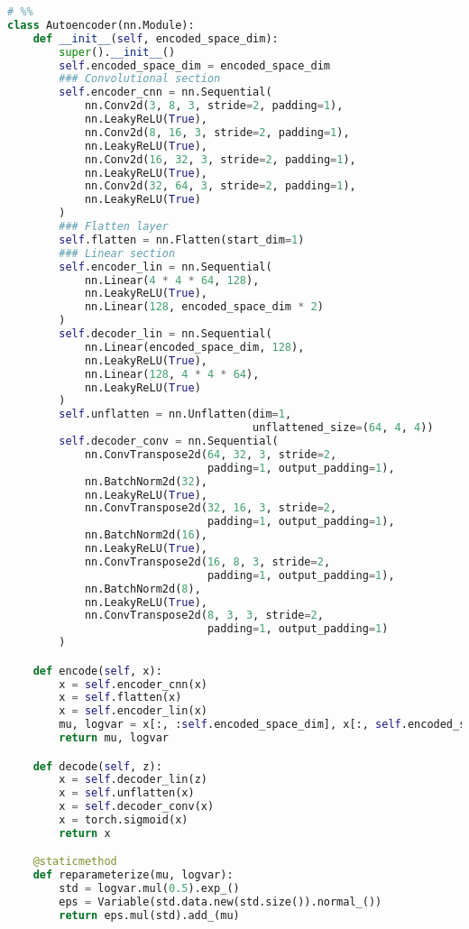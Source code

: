 \documentclass{article}
\begin{document}
\begin{lstlisting}[language=Python]
# %%
class Autoencoder(nn.Module):
    def __init__(self, encoded_space_dim):
        super().__init__()
        self.encoded_space_dim = encoded_space_dim
        ### Convolutional section
        self.encoder_cnn = nn.Sequential(
            nn.Conv2d(3, 8, 3, stride=2, padding=1),
            nn.LeakyReLU(True),
            nn.Conv2d(8, 16, 3, stride=2, padding=1),
            nn.LeakyReLU(True),
            nn.Conv2d(16, 32, 3, stride=2, padding=1),
            nn.LeakyReLU(True),
            nn.Conv2d(32, 64, 3, stride=2, padding=1),
            nn.LeakyReLU(True)
        )
        ### Flatten layer
        self.flatten = nn.Flatten(start_dim=1)
        ### Linear section
        self.encoder_lin = nn.Sequential(
            nn.Linear(4 * 4 * 64, 128),
            nn.LeakyReLU(True),
            nn.Linear(128, encoded_space_dim * 2)
        )
        self.decoder_lin = nn.Sequential(
            nn.Linear(encoded_space_dim, 128),
            nn.LeakyReLU(True),
            nn.Linear(128, 4 * 4 * 64),
            nn.LeakyReLU(True)
        )
        self.unflatten = nn.Unflatten(dim=1,
                                      unflattened_size=(64, 4, 4))
        self.decoder_conv = nn.Sequential(
            nn.ConvTranspose2d(64, 32, 3, stride=2,
                               padding=1, output_padding=1),
            nn.BatchNorm2d(32),
            nn.LeakyReLU(True),
            nn.ConvTranspose2d(32, 16, 3, stride=2,
                               padding=1, output_padding=1),
            nn.BatchNorm2d(16),
            nn.LeakyReLU(True),
            nn.ConvTranspose2d(16, 8, 3, stride=2,
                               padding=1, output_padding=1),
            nn.BatchNorm2d(8),
            nn.LeakyReLU(True),
            nn.ConvTranspose2d(8, 3, 3, stride=2,
                               padding=1, output_padding=1)
        )

    def encode(self, x):
        x = self.encoder_cnn(x)
        x = self.flatten(x)
        x = self.encoder_lin(x)
        mu, logvar = x[:, :self.encoded_space_dim], x[:, self.encoded_space_dim:]
        return mu, logvar

    def decode(self, z):
        x = self.decoder_lin(z)
        x = self.unflatten(x)
        x = self.decoder_conv(x)
        x = torch.sigmoid(x)
        return x

    @staticmethod
    def reparameterize(mu, logvar):
        std = logvar.mul(0.5).exp_()
        eps = Variable(std.data.new(std.size()).normal_())
        return eps.mul(std).add_(mu)



\end{lstlisting}
\end{document}
